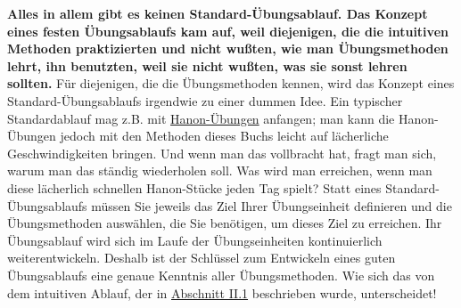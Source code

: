 \textbf{Alles in allem gibt es keinen Standard-Übungsablauf.
Das Konzept eines festen Übungsablaufs kam auf, weil diejenigen, die die intuitiven Methoden praktizierten und nicht wußten, wie man Übungsmethoden lehrt, ihn benutzten, weil sie nicht wußten, was sie sonst lehren sollten.}
Für diejenigen, die die Übungsmethoden kennen, wird das Konzept eines Standard-Übungsablaufs irgendwie zu einer dummen Idee.
Ein typischer Standardablauf mag z.B. mit \hyperlink{c1iii7h}{Hanon-Übungen} anfangen; man kann die Hanon-Übungen jedoch mit den Methoden dieses Buchs leicht auf lächerliche Geschwindigkeiten bringen.
Und wenn man das vollbracht hat, fragt man sich, warum man das ständig wiederholen soll.
Was wird man erreichen, wenn man diese lächerlich schnellen Hanon-Stücke jeden Tag spielt?
Statt eines Standard-Übungsablaufs müssen Sie jeweils das Ziel Ihrer Übungseinheit definieren und die Übungsmethoden auswählen, die Sie benötigen, um dieses Ziel zu erreichen.
Ihr Übungsablauf wird sich im Laufe der Übungseinheiten kontinuierlich weiterentwickeln.
Deshalb ist der Schlüssel zum Entwickeln eines guten Übungsablaufs eine genaue Kenntnis aller Übungsmethoden.
Wie sich das von dem intuitiven Ablauf, der in \hyperlink{c1ii1}{Abschnitt II.1} beschrieben wurde, unterscheidet!



